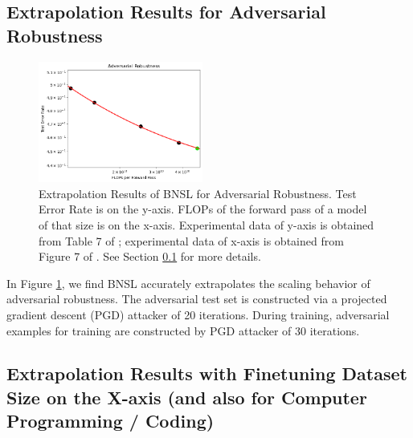 \documentclass{article} %
\begin{document}
\subsection{Extrapolation Results for Adversarial Robustness}
\label{section:adversarial_robustness}

\vspace{-3.5mm}

\begin{figure}[htbp]
    \centering
\includegraphics[width=0.48\textwidth]{figures/adversarial_robustness/adversarial_robustness__pgd_20.png}
    \caption{
Extrapolation Results of BNSL for Adversarial Robustness. Test Error Rate is on the y-axis. FLOPs of the forward pass of a model of that size is on the x-axis. Experimental data of y-axis is obtained from Table 7 of \cite{Xie2020Intriguing}; experimental data of x-axis is obtained from Figure 7 of \cite{Xie2020Intriguing}. See Section \ref{section:adversarial_robustness} for more details.
    }
    \label{fig:adversarial_robustness}
\end{figure}

In Figure \ref{fig:adversarial_robustness}, we find BNSL accurately extrapolates the scaling behavior of adversarial robustness. The adversarial test set is constructed via a projected gradient descent (PGD) attacker \citep{madry2018towards} of 20 iterations. During training, adversarial examples for training are constructed by PGD attacker of 30 iterations.

\clearpage

\subsection{Extrapolation Results with Finetuning Dataset Size on the X-axis (and also for Computer Programming / Coding)}
\label{section:finetuning}
\end{document}
